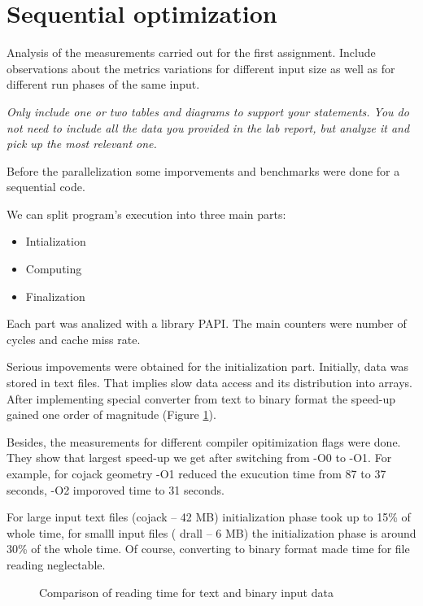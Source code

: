 \documentclass[12pt, a4paper]{article}
\newcommand{\draft}[1]{\textcolor{NavyBlue}{#1}}
\newcommand{\hint}[1]{\textcolor{OliveGreen}{{\it#1}}}
\begin{document}


\section{Sequential optimization}

\draft{Analysis of the measurements carried out for the first assignment. 
Include observations about the metrics variations for different input size 
as well as for different run phases of the same input.}

\hint{Only include one or two tables and diagrams to support your statements. 
You do not need to include all the data you provided in the lab report, 
but analyze it and pick up the most relevant one.}

Before the parallelization some imporvements and benchmarks were done for a 
sequential code.

We can split program's execution into three main parts:
\begin{itemize}
	\item Intialization
	\item Computing
	\item Finalization
\end{itemize}

Each part was analized with a library PAPI. The main counters were number of cycles and
cache miss rate.

Serious impovements were obtained for the initialization part.
Initially, data was stored in text files. That implies slow data access and
its distribution into arrays.
After implementing special converter from text to binary format
the speed-up gained one order of magnitude (Figure \ref{fig:TextBin}).

Besides, the measurements for different compiler opitimization flags
were done. They show that largest speed-up we get after switching from 
-O0 to -O1. For example, for cojack geometry -O1 reduced the exucution
time from 87 to 37 seconds, -O2 imporoved time to 31 seconds.

For large input text files (cojack -- 42 MB) initialization phase took up to
15\% of whole time, for smalll input files ( drall -- 6 MB) 
the initialization phase is around 30\% of the whole time.
Of course, converting to binary format made 
time for file reading neglectable.

\begin{figure}[ht]
	\caption{Comparison of reading time for text and binary input data}
	\label{fig:TextBin}
\end{figure}
\end{document}
